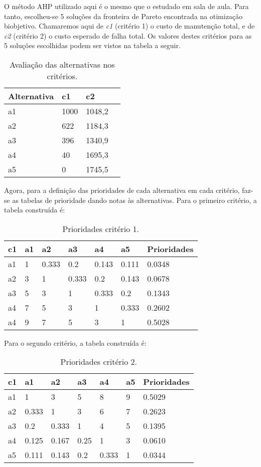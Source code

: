 O método AHP utilizado aqui é o mesmo que o estudado em sala de aula. Para tanto, escolheu-se 5 soluções da fronteira de Pareto encontrada na otimização biobjetivo. Chamaremos aqui de \textit{c1} (critério 1) o custo de manutenção total, e de \textit{c2} (critério 2) o custo esperado de falha total. Os valores destes critérios para as 5 soluções escolhidas podem ser vistos na tabela a seguir.
\begin{table}[h]
	\centering
	\begin{tabular}{ | l | l | l | l |}
		\hline
		Alternativa & c1 & c2 \\ \hline
		a1 & 1000 & 1048,2 \\ \hline
		a2 & 622 & 1184,3 \\ \hline
		a3 & 396 & 1340,9 \\ \hline
		a4 & 40 & 1695,3 \\ \hline
		a5 & 0 & 1745,5 \\ \hline
	\end{tabular}
	\label{table:c-ahp}
	\caption{Avaliação das alternativas nos critérios.}
\end{table}

Agora, para a definição das prioridades de cada alternativa em cada critério, faz-se as tabelas de prioridade dando notas às alternativas. Para o primeiro critério, a tabela construída é:
\begin{table}[h]
	\centering
	\begin{tabular}{ | l | l | l | l | l | l | l | }
		\hline
		c1 & a1 & a2 & a3 & a4 & a5 & Prioridades \\ \hline
		a1 & 1 & 0.333 & 0.2 & 0.143 & 0.111 & 0.0348 \\ \hline
		a2 & 3 & 1 & 0.333 & 0.2 & 0.143 & 0.0678 \\ \hline
		a3 & 5 & 3 & 1 & 0.333 & 0.2 & 0.1343 \\ \hline
		a4 & 7 & 5 & 3 & 1 & 0.333 & 0.2602 \\ \hline
		a4 & 9 & 7 & 5 & 3 & 1 & 0.5028 \\ \hline
	\end{tabular}
	\label{table:c1}
	\caption{Prioridades critério 1.}
\end{table}

Para o segundo critério, a tabela construída é:
\begin{table}[h]
	\centering
	\begin{tabular}{ | l | l | l | l | l | l | l | }
		\hline
		c1 & a1 & a2 & a3 & a4 & a5 & Prioridades \\ \hline
		a1 & 1 & 3 & 5 & 8 & 9 & 0.5029 \\ \hline
		a2 & 0.333 & 1 & 3 & 6 & 7 & 0.2623 \\ \hline
		a3 & 0.2 & 0.333 & 1 & 4 & 5 & 0.1395 \\ \hline
		a4 & 0.125 & 0.167 & 0.25 & 1 & 3 & 0.0610 \\ \hline
		a5 & 0.111 & 0.143 & 0.2 & 0.333 & 1 & 0.0344 \\ \hline
	\end{tabular}
	\label{table:c2}
	\caption{Prioridades critério 2.}
\end{table}

